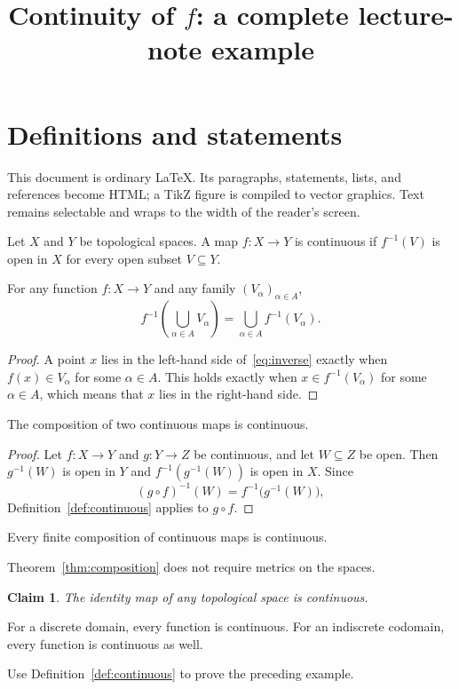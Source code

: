 \documentclass[11pt]{article}
\title{Continuity of $f$: a complete lecture-note example}
\newtheorem{claim}[theorem]{Claim}
\newcommand{\inv}[1]{#1^{-1}}
\begin{document}
\maketitle

\section{Definitions and statements}
This document is ordinary LaTeX. Its paragraphs, statements, lists, and
references become HTML; a TikZ figure is compiled to vector graphics.
Text remains selectable and wraps to the width of the reader's screen.

\begin{definition}[Continuity]\label{def:continuous}
Let $X$ and $Y$ be topological spaces. A map $f:X\to Y$ is continuous if
$\inv{f}(V)$ is open in $X$ for every open subset $V\subseteq Y$.
\end{definition}

\begin{lemma}\label{lem:inverse}
For any function $f:X\to Y$ and any family $(V_\alpha)_{\alpha\in A}$,
\begin{equation}\label{eq:inverse}
  \inv{f}\!\left(\bigcup_{\alpha\in A}V_\alpha\right)
  =\bigcup_{\alpha\in A}\inv{f}(V_\alpha).
\end{equation}
\end{lemma}
\begin{proof}
A point $x$ lies in the left-hand side of~\eqref{eq:inverse} exactly when
$f(x)\in V_\alpha$ for some $\alpha\in A$. This holds exactly when
$x\in\inv{f}(V_\alpha)$ for some $\alpha\in A$, which means that $x$
lies in the right-hand side.
\end{proof}

\begin{theorem}\label{thm:composition}
The composition of two continuous maps is continuous.
\end{theorem}
\begin{proof}
Let $f:X\to Y$ and $g:Y\to Z$ be continuous, and let $W\subseteq Z$
be open. Then $\inv{g}(W)$ is open in $Y$ and
$\inv{f}(\inv{g}(W))$ is open in $X$. Since
\[
  \inv{(g\circ f)}(W)=\inv{f}\bigl(\inv{g}(W)\bigr),
\]
Definition~\ref{def:continuous} applies to $g\circ f$.
\end{proof}
\begin{corollary}
Every finite composition of continuous maps is continuous.
\end{corollary}
\begin{remark}
Theorem~\ref{thm:composition} does not require metrics on the spaces.
\end{remark}
\begin{claim}
The identity map of any topological space is continuous.
\end{claim}
\begin{example}
For a discrete domain, every function is continuous. For an indiscrete
codomain, every function is continuous as well.
\end{example}
\begin{exercise}
Use Definition~\ref{def:continuous} to prove the preceding example.
\end{exercise}
\end{document}
